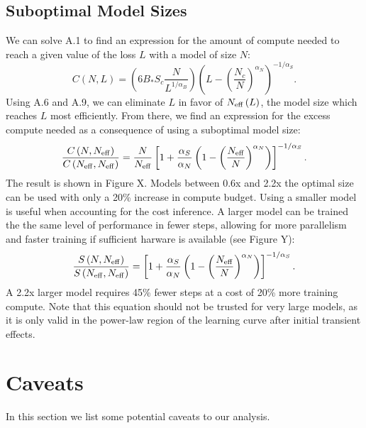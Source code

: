 \documentclass[english]{article}
\newcommand{\be}{\begin{equation}}
\newcommand{\ee}{\end{equation}}
\begin{document}
\subsection{Suboptimal Model Sizes}
\label{sec:suboptimal-models}
We can solve A.1 to find an expression for the amount of compute needed to reach a given value of the loss $L$ with a model of size $N$:
\be
C\left(N,L\right)=\left(6B_{\ast}S_{c}\frac{N}{L^{1/\alpha_{B}}}\right)\left(L-\left(\frac{N_{c}}{N}\right)^{\alpha_{N}}\right)^{-1/\alpha_{S}}.
\ee
Using A.6 and A.9, we can eliminate $L$ in favor of $N_{{\rm eff}}\left(L\right)$, the model size which reaches $L$ most efficiently. From there, we find an expression for the excess compute needed as a consequence of using a suboptimal model size: 
\be
\frac{C\left(N,N_{{\rm eff}}\right)}{C\left(N_{{\rm eff}},N_{{\rm eff}}\right)}=\frac{N}{N_{{\rm eff}}}\left[1+\frac{\alpha_{S}}{\alpha_{N}}\left(1-\left(\frac{N_{{\rm eff}}}{N}\right)^{\alpha_{N}}\right)\right]^{-1/\alpha_{S}}.
\ee
The result is shown in Figure X. Models between 0.6x and 2.2x the optimal size can be used with only a 20\% increase in compute budget. Using a smaller model is useful when accounting for the cost inference. A larger model can be trained the the same level of performance in fewer steps, allowing for more parallelism and faster training if sufficient harware is available (see Figure Y):
\be
\frac{S\left(N,N_{{\rm eff}}\right)}{S\left(N_{{\rm eff}},N_{{\rm eff}}\right)}=\left[1+\frac{\alpha_{S}}{\alpha_{N}}\left(1-\left(\frac{N_{{\rm eff}}}{N}\right)^{\alpha_{N}}\right)\right]^{-1/\alpha_{S}}.
\ee
A 2.2x larger model requires 45\% fewer steps at a cost of 20\% more training compute. Note that this equation should not be trusted for very large models, as it is only valid in the power-law region of the learning curve after initial transient effects.

\section{Caveats}

In this section we list some potential caveats to our analysis.
\end{document}
